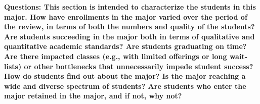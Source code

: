 \documentclass[12pt]{article}
\begin{document}
{\bf Questions: This section is intended to characterize the students in this major. How have enrollments in the major varied over the period of the review, in terms of both the numbers and quality of the students? Are students succeeding in the major both in terms of qualitative and quantitative academic standards? Are students graduating on time? Are there impacted classes (e.g., with limited offerings or long wait-lists) or other bottlenecks that unnecessarily impede student success? How do students find out about the major?  Is the major reaching a wide and diverse spectrum of students? Are students who enter the major retained in the major, and if not, why not?}\\[3pt]

\end{document}
